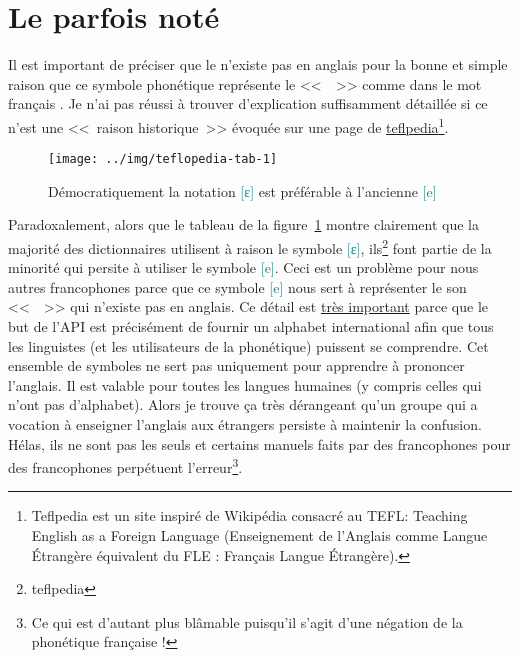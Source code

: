 \section{Le \son {}  parfois noté 
  }\label{sec:sone}

Il est important de préciser que le \son {} n'existe pas en anglais
pour la bonne et simple raison que ce symbole phonétique représente le
<<~~>> comme dans le mot français . Je n'ai pas réussi à
trouver d'explication suffisamment détaillée si ce n'est une <<~raison
historique~>> évoquée sur une page de
\href{http://teflpedia.com/IPA_phonetic_symbol_\%E3\%80\%9A\%C9\%9B\%E3\%80\%9B}{teflpedia}\footnote{Teflpedia
est un site inspiré de Wikipédia consacré au TEFL: Teaching English as
a Foreign Language (Enseignement de l'Anglais comme Langue \'Etrangère
équivalent du FLE : Français Langue \'Etrangère).}.

\begin{center}
  \begin{figure}[h]
    \centering
    \texttt{[image: ../img/teflopedia-tab-1]}
    \caption[Quel symbole phonétique pour le son <<~~>>]{Démocratiquement
      la notation \textcolor{teal}{[ɛ]} est préférable à l'ancienne \textcolor{teal}{[e]}}
    \label{fig:teflpedia-1}
  \end{figure}
\end{center}

Paradoxalement, alors que le tableau de la
figure~\ref{fig:teflpedia-1} montre clairement que la majorité des
dictionnaires utilisent à raison le symbole \textcolor{teal}{[ɛ]},
ils\footnote{teflpedia} font partie de la minorité qui persite à
utiliser le symbole \textcolor{teal}{[e]}. Ceci est un problème pour
nous autres francophones parce que ce symbole \textcolor{teal}{[e]}
nous sert à représenter le son <<~~>> qui n'existe pas en
anglais. Ce détail est \underline{très important} parce que le but de
l'API est précisément de fournir un alphabet international afin que
tous les linguistes (et les utilisateurs de la phonétique) puissent se 
comprendre. Cet ensemble de symboles ne sert pas uniquement pour
apprendre à prononcer l'anglais. Il est valable pour toutes les
langues humaines (y compris celles qui n'ont pas d'alphabet). Alors je
trouve ça très dérangeant qu'un groupe qui a vocation à enseigner
l'anglais aux étrangers persiste à maintenir la confusion. Hélas, ils
ne sont pas les seuls et certains manuels faits par des francophones
pour des francophones perpétuent l'erreur\footnote{Ce qui est d'autant
  plus blâmable puisqu'il s'agit d'une négation de la phonétique
  française !}.

